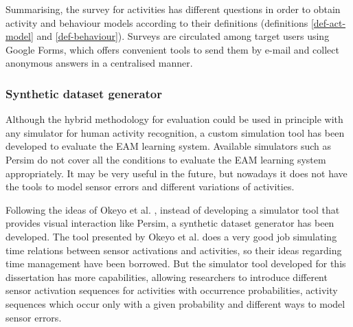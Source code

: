 Summarising, the survey for activities has different questions in order to obtain activity and behaviour models according to their definitions (definitions \ref{def-act-model} and \ref{def-behaviour}). Surveys are circulated among target users using Google Forms, which offers convenient tools to send them by e-mail and collect anonymous answers in a centralised manner.



\subsubsection{Synthetic dataset generator}
\label{subsubsec:evaluation:synthetic}
\begin{comment}
 - Explain the script: sensor activation patterns, activity patterns (sequences and alterations), sensor positive noise
 - Explain probabilistic sensor modelling
 - Explain probabilistic time lapses
 - Show output examples and give numbers
\end{comment}
Although the hybrid methodology for evaluation could be used in principle with any simulator for human activity recognition, a custom simulation tool has been developed to evaluate the EAM learning system. Available simulators such as Persim do not cover all the conditions to evaluate the EAM learning system appropriately. It may be very useful in the future, but nowadays it does not have the tools to model sensor errors and different variations of activities.

Following the ideas of Okeyo et al. \cite{Okeyo2012a}, instead of developing a simulator tool that provides visual interaction like Persim, a synthetic dataset generator has been developed. The tool presented by Okeyo et al. does a very good job simulating time relations between sensor activations and activities, so their ideas regarding time management have been borrowed. But the simulator tool developed for this dissertation has more capabilities, allowing researchers to introduce different sensor activation sequences for activities with occurrence probabilities, activity sequences which occur only with a given probability and different ways to model sensor errors.

